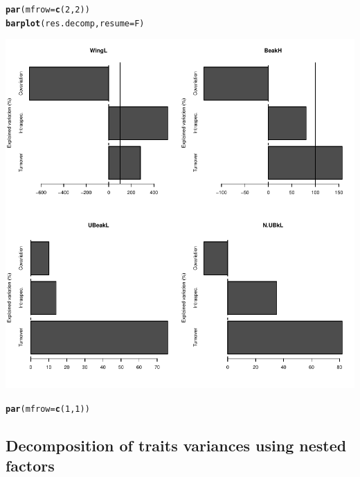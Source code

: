 \documentclass[12pt]{article}\usepackage[]{graphicx}\usepackage[]{color}
\makeatletter
\def\maxwidth{ %
  \ifdim\Gin@nat@width>\linewidth
    \linewidth
  \else
    \Gin@nat@width
  \fi
}
\newcommand{\hlnum}[1]{\textcolor[rgb]{0.686,0.059,0.569}{#1}}%
\newcommand{\hlstd}[1]{\textcolor[rgb]{0.345,0.345,0.345}{#1}}%
\newcommand{\hlkwc}[1]{\textcolor[rgb]{0.333,0.667,0.333}{#1}}%
\newcommand{\hlkwd}[1]{\textcolor[rgb]{0.737,0.353,0.396}{\textbf{#1}}}%
\newenvironment{kframe}{%
 \def\at@end@of@kframe{}%
 \ifinner\ifhmode%
  \def\at@end@of@kframe{\end{minipage}}%
  \begin{minipage}{\columnwidth}%
 \fi\fi%
 \def\FrameCommand##1{\hskip\@totalleftmargin \hskip-\fboxsep
 \colorbox{shadecolor}{##1}\hskip-\fboxsep
     \hskip-\linewidth \hskip-\@totalleftmargin \hskip\columnwidth}%
 \MakeFramed {\advance\hsize-\width
   \@totalleftmargin\z@ \linewidth\hsize
   \@setminipage}}%
 {\par\unskip\endMakeFramed%
 \at@end@of@kframe}
\newenvironment{knitrout}{}{} %
\makeatother
\begin{document}
\begin{knitrout}
\color{fgcolor}\begin{kframe}
\begin{alltt}
\hlkwd{par}\hlstd{(}\hlkwc{mfrow} \hlstd{=} \hlkwd{c}\hlstd{(}\hlnum{2}\hlstd{,}\hlnum{2}\hlstd{))}
\hlkwd{barplot}\hlstd{(res.decomp,} \hlkwc{resume} \hlstd{= F)}
\end{alltt}
\end{kframe}

{\centering \includegraphics[width=\maxwidth]{figure/unnamed-chunk-23-1} 

}


\begin{kframe}\begin{alltt}
\hlkwd{par}\hlstd{(}\hlkwc{mfrow} \hlstd{=} \hlkwd{c}\hlstd{(}\hlnum{1}\hlstd{,}\hlnum{1}\hlstd{))}
\end{alltt}
\end{kframe}
\end{knitrout}

\newpage

\subsection{Decomposition of traits variances using nested factors}
\end{document}
